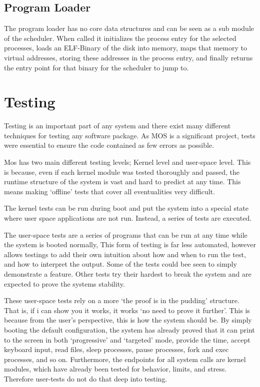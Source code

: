 \documentclass[a4paper]{report}
\begin{document}
\section{Program Loader}

The program loader has no core data structures and can be seen as a sub module of the scheduler. When called it initializes the process entry for the selected processes, loads an ELF-Binary of the disk into memory, maps that memory to virtual addresses, storing these addresses in the process entry, and finally returns the entry point for that binary for the scheduler to jump to.








\chapter{Testing}

Testing is an important part of any system and there exist many different techniques for testing any software package. As MOS is a significant project, tests were essential to ensure the code contained as few errors as possible. 

Mos has two main different testing levels; Kernel level and user-space level. This is because, even if each kernel module was tested thoroughly and passed, the runtime structure of the system is vast and hard to predict at any time. This means making `offline' tests that cover all eventualities very difficult.

The kernel tests can be run during boot and put the system into a special state where user space applications are not run. Instead, a series of tests are executed.

The user-space tests are a series of programs that can be run at any time while the system is booted normally, This form of testing is far less automated, however allows testings to add their own intuition about how and when to run the test, and how to interpret the output. Some of the tests could bee seen to simply demonstrate a feature. Other tests try their hardest to break the system and are expected to prove the systems stability.

These user-space tests rely on a more `the proof is in the pudding' structure. That is, if i can show you it works, it works `no need to prove it further'. This is because from the user's perspective, this is how the system should be. By simply booting the default configuration, the system has already proved that it can print to the screen in both `progressive' and `targeted' mode, provide the time, accept keyboard input, read files, sleep processes, pause processes, fork and exec processes, and so on. Furthermore, the endpoints for all system calls are kernel modules, which have already been tested for behavior, limits, and stress. Therefore user-tests do not do that deep into testing. 
\end{document}
